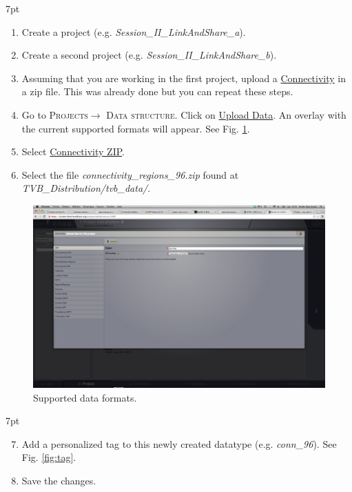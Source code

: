 \documentclass{tufte-handout}
\newenvironment{formal}{%
  \def\FrameCommand{%
    \hspace{1pt}%
    {\color{DarkBlue}\vrule width 2pt}%
    {\color{formalshade}\vrule width 4pt}%
    \colorbox{formalshade}%
  }%
  \MakeFramed{\advance\hsize-\width\FrameRestore}%
  \noindent\hspace{-4.55pt}%
  \begin{adjustwidth}{}{7pt}%
  \vspace{2pt}\vspace{2pt}%
}
{%
  \vspace{2pt}\end{adjustwidth}\endMakeFramed%
}
\begin{document}
\begin{formal}
\begin{enumerate}
\item Create a project (e.g. \textit{Session\_II\_LinkAndShare\_a}). 
\item Create a second project (e.g. \textit{Session\_II\_LinkAndShare\_b}). 
\item Assuming that you are working in the first project, upload a \underline{Connectivity} in a zip file. This was already done but you can repeat these steps. 
\item Go to \textsc{Projects}$\rightarrow$ \textsc{Data structure}. Click on \underline{Upload Data}. An overlay with the current supported formats will appear. See Fig. \ref{fig:uploaders}. 
\item Select \underline{Connectivity ZIP}. 
\item Select the file \textit{connectivity\_regions\_96.zip} found at \textit{TVB\_Distribution/tvb\_data/}.
\end{enumerate}
\end{formal} 

\begin{figure}[h]
  \includegraphics[width=\linewidth]{Handout_UI_LinkAndShare_Uploaders}%
  \caption{Supported data formats.}%
  \label{fig:uploaders}%
\end{figure}


\begin{formal}
\begin{enumerate}[resume]
\setcounter{enumi}{6}
\item Add a personalized tag to this newly created datatype (e.g. \textit{conn\_96}).  See Fig. \ref{fig:tag}. 
\item Save the changes.
\end{enumerate}
\end{formal}
\end{document}
